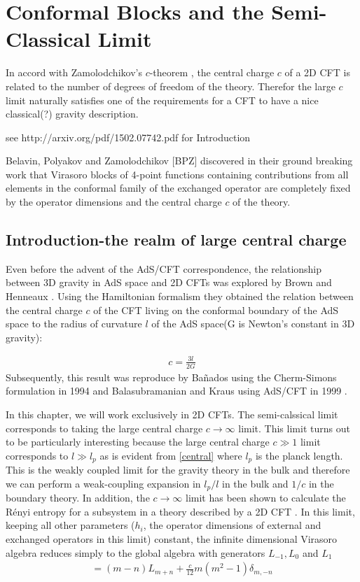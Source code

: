   \chapter{Conformal Blocks and the Semi-Classical Limit} \label{ch:semiclassical}
  
  In accord with Zamolodchikov's $c$-theorem \cite{Zamolodchikov:1986gt}, the central charge $c$ of a 2D CFT is related to the number of degrees of freedom of the theory. Therefor the large $c$ limit naturally satisfies one of the requirements for a CFT to have a nice classical(?) gravity description. 
  
  see http://arxiv.org/pdf/1502.07742.pdf for Introduction
  
  Belavin, Polyakov and Zamolodchikov [BPZ] discovered in their ground breaking work \cite{Belavin:1984vu} that Virasoro blocks of 4-point functions containing contributions from all elements in the conformal family of the exchanged operator are completely fixed by the operator dimensions and the central charge $c$ of the theory.
  \section{Introduction-the realm of large central charge}
   Even before the advent of the AdS/CFT correspondence, the relationship between 3D gravity in AdS space and 2D CFTs was explored by Brown and Henneaux \cite{Brown:1986nw}. Using the Hamiltonian formalism they obtained the relation between the central charge $c$ of the CFT living on the conformal boundary of the AdS space to the radius of curvature $l$ of the AdS space(G is Newton's constant in 3D gravity):
 
 \begin{align}
  c=\frac{3l}{2G} \label{central}
 \end{align}
Subsequently, this result was reproduce by Ba\~{n}ados using the Cherm-Simons formulation in 1994 \cite{Banados:1994tn} and Balasubramanian and Kraus using AdS/CFT in 1999 \cite{Balasubramanian:1999re}.
  
  In this chapter, we will work exclusively in 2D CFTs. The semi-calssical limit corresponds to taking the large central charge $c \to \infty$ limit. This limit turns out to be particularly interesting because the large central charge $c \gg 1$ limit corresponds to $l \gg l_p$ as is evident from \ref{central} where $l_p$ is the planck length. This is the weakly coupled limit for the gravity theory in the bulk and therefore we can perform a weak-coupling expansion in $l_p/l$ in the bulk and $1/c$ in the boundary theory. In addition, the $c \to \infty$ limit has been shown to calculate the R\'{e}nyi entropy for a subsystem in a theory described by a 2D CFT \cite{Hartman:2013mia}. In this limit, keeping all other parameters ($h_i$, the operator dimensions of external and exchanged operators in this limit) constant, the infinite dimensional Virasoro algebra reduces simply to the global algebra with generators $L_{-1}, L_0$ and $L_1$
  \begin{align*}
   [L_m,L_n] = (m-n)L_{m+n} + \frac{c}{12}m(m^2-1) \delta_{m,-n}
  \end{align*}
  
